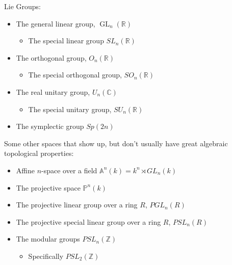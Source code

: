 \begin{example}

Lie Groups:

\begin{itemize}
\tightlist
\item
  The general linear group, \(\operatorname{GL}_{n}({\mathbb{R}})\)

  \begin{itemize}
  \tightlist
  \item
    The special linear group \(SL_{n}({\mathbb{R}})\)
  \end{itemize}
\item
  The orthogonal group, \(O_{n}({\mathbb{R}})\)

  \begin{itemize}
  \tightlist
  \item
    The special orthogonal group, \(SO_{n}({\mathbb{R}})\)
  \end{itemize}
\item
  The real unitary group, \(U_{n}({\mathbb{C}})\)

  \begin{itemize}
  \tightlist
  \item
    The special unitary group, \(SU_{n}({\mathbb{R}})\)
  \end{itemize}
\item
  The symplectic group \(Sp(2n)\)
\end{itemize}

\end{example}

\begin{example}

Some other spaces that show up, but don't usually have great algebraic
topological properties:

\begin{itemize}
\tightlist
\item
  Affine \(n\)-space over a field
  \({\mathbb{A}}^n(k) = k^n \rtimes GL_{n}(k)\)
\item
  The projective space \({\mathbb{P}}^n(k)\)
\item
  The projective linear group over a ring \(R\), \(PGL_{n}(R)\)
\item
  The projective special linear group over a ring \(R\), \(PSL_{n}(R)\)
\item
  The modular groups \(PSL_{n}({\mathbb{Z}})\)

  \begin{itemize}
  \tightlist
  \item
    Specifically \(PSL_{2}({\mathbb{Z}})\)
  \end{itemize}
\end{itemize}

\end{example}

